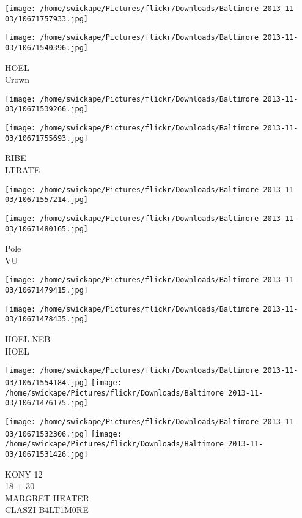 \documentclass[10pt,letterpaper]{article}
\begin{document}
\texttt{[image: /home/swickape/Pictures/flickr/Downloads/Baltimore 2013-11-03/10671757933.jpg]}

\vspace{0.25in}
\texttt{[image: /home/swickape/Pictures/flickr/Downloads/Baltimore 2013-11-03/10671540396.jpg]}

HOEL\\
Crown\\
\pagebreak

\texttt{[image: /home/swickape/Pictures/flickr/Downloads/Baltimore 2013-11-03/10671539266.jpg]}

\vspace{0.25in}
\texttt{[image: /home/swickape/Pictures/flickr/Downloads/Baltimore 2013-11-03/10671755693.jpg]}

RIBE\\
LTRATE\\
\pagebreak

\texttt{[image: /home/swickape/Pictures/flickr/Downloads/Baltimore 2013-11-03/10671557214.jpg]}

\vspace{0.25in}
\texttt{[image: /home/swickape/Pictures/flickr/Downloads/Baltimore 2013-11-03/10671480165.jpg]}

Pole\\
VU\\
\pagebreak

\texttt{[image: /home/swickape/Pictures/flickr/Downloads/Baltimore 2013-11-03/10671479415.jpg]}

\vspace{0.25in}
\texttt{[image: /home/swickape/Pictures/flickr/Downloads/Baltimore 2013-11-03/10671478435.jpg]}

HOEL NEB\\
HOEL\\
\pagebreak

\texttt{[image: /home/swickape/Pictures/flickr/Downloads/Baltimore 2013-11-03/10671554184.jpg]}
\texttt{[image: /home/swickape/Pictures/flickr/Downloads/Baltimore 2013-11-03/10671476175.jpg]}

\texttt{[image: /home/swickape/Pictures/flickr/Downloads/Baltimore 2013-11-03/10671532306.jpg]}
\texttt{[image: /home/swickape/Pictures/flickr/Downloads/Baltimore 2013-11-03/10671531426.jpg]}

KONY 12\\
18 + 30\\
MARGRET HEATER\\
CLASZI B4LT1M0RE\\
\pagebreak
\end{document}
